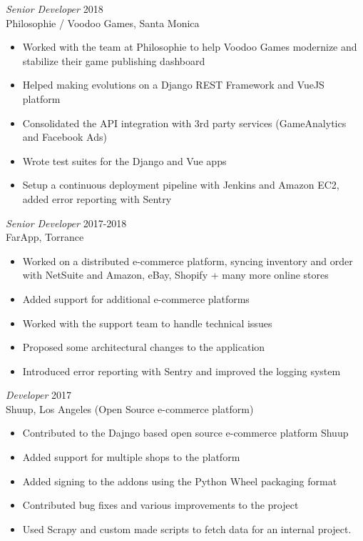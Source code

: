 \documentclass[line,resmargin]{res}
\begin{document}
\begin{resume}
{\sl Senior Developer\/} \hfill 2018\\
Philosophie / Voodoo Games, Santa Monica
\begin{itemize} \itemsep -2pt
\item Worked with the team at Philosophie to help Voodoo Games modernize and stabilize their game publishing dashboard
\item Helped making evolutions on a Django REST Framework and VueJS platform
\item Consolidated the API integration with 3rd party services (GameAnalytics and Facebook Ads)
\item Wrote test suites for the Django and Vue apps
\item Setup a continuous deployment pipeline with Jenkins and Amazon EC2, added error reporting with Sentry
\end{itemize}

{\sl Senior Developer\/} \hfill 2017-2018\\
FarApp, Torrance
\begin{itemize} \itemsep -2pt
\item Worked on a distributed e-commerce platform, syncing inventory and order with NetSuite and Amazon, eBay, Shopify + many more online stores
\item Added support for additional e-commerce platforms
\item Worked with the support team to handle technical issues
\item Proposed some architectural changes to the application
\item Introduced error reporting with Sentry and improved the logging system
\end{itemize}

{\sl Developer\/} \hfill 2017\\
Shuup, Los Angeles (Open Source e-commerce platform)
\begin{itemize} \itemsep -2pt
    \item Contributed to the Dajngo based open source e-commerce platform Shuup
    \item Added support for multiple shops to the platform
    \item Added signing to the addons using the Python Wheel packaging format
    \item Contributed bug fixes and various improvements to the project
    \item Used Scrapy and custom made scripts to fetch data for an internal project.
\end{itemize}


\end{resume}
\end{document}
